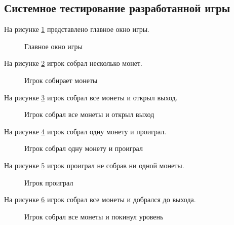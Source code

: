 \subsection{Системное тестирование разработанной игры}

На рисунке \ref{maino:image} представлено главное окно игры.
\newpage %
\begin{figure}[H] %
\caption{Главное окно игры}
\label{maino:image}
\end{figure}

На рисунке \ref{menu:image} игрок собрал несколько монет.

\begin{figure}[H]
\caption{Игрок собирает монеты}
\label{menu:image}
\end{figure}

На рисунке \ref{enter:image} игрок собрал все монеты и открыл выход.

\begin{figure}[H]
\caption{Игрок собрал все монеты и открыл выход}
\label{enter:image}
\end{figure}

На рисунке \ref{enter1:image} игрок собрал одну монету и проиграл.

\begin{figure}[H]
	\caption{Игрок собрал одну монету и проиграл}
	\label{enter1:image}
\end{figure}

На рисунке \ref{enter2:image} игрок проиграл не собрав ни одной монеты.

\begin{figure}[H]
	\caption{Игрок проиграл}
	\label{enter2:image}
\end{figure}

На рисунке \ref{enter3:image} игрок собрал все монеты и добрался до выхода.

\begin{figure}[H]
	\caption{Игрок собрал все монеты и покинул уровень}
	\label{enter3:image}
\end{figure}